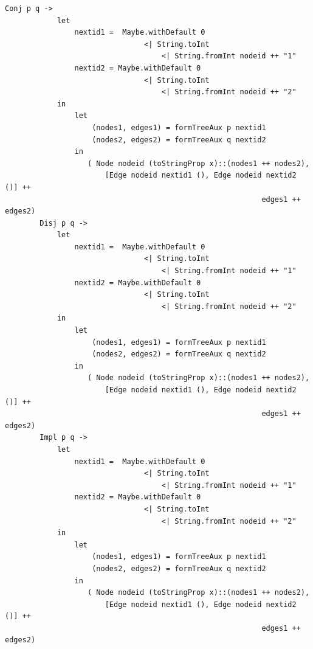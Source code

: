 \documentclass[a4paper]{report}
\begin{document}
\begin{lstlisting}[caption= Definición de las funciones \textit{formTree} y \textit{formTree2DOT}]
        Conj p q -> 
            let 
                nextid1 =  Maybe.withDefault 0 
                                <| String.toInt 
                                    <| String.fromInt nodeid ++ "1"
                nextid2 = Maybe.withDefault 0 
                                <| String.toInt 
                                    <| String.fromInt nodeid ++ "2"
            in
                let 
                    (nodes1, edges1) = formTreeAux p nextid1
                    (nodes2, edges2) = formTreeAux q nextid2
                in
                   ( Node nodeid (toStringProp x)::(nodes1 ++ nodes2),  
                       [Edge nodeid nextid1 (), Edge nodeid nextid2 ()] ++ 
                                                           edges1 ++ edges2)
        Disj p q -> 
            let 
                nextid1 =  Maybe.withDefault 0 
                                <| String.toInt 
                                    <| String.fromInt nodeid ++ "1"
                nextid2 = Maybe.withDefault 0 
                                <| String.toInt 
                                    <| String.fromInt nodeid ++ "2"
            in
                let 
                    (nodes1, edges1) = formTreeAux p nextid1
                    (nodes2, edges2) = formTreeAux q nextid2
                in
                   ( Node nodeid (toStringProp x)::(nodes1 ++ nodes2),  
                       [Edge nodeid nextid1 (), Edge nodeid nextid2 ()] ++ 
                                                           edges1 ++ edges2)
        Impl p q -> 
            let 
                nextid1 =  Maybe.withDefault 0 
                                <| String.toInt 
                                    <| String.fromInt nodeid ++ "1"
                nextid2 = Maybe.withDefault 0 
                                <| String.toInt 
                                    <| String.fromInt nodeid ++ "2"
            in
                let 
                    (nodes1, edges1) = formTreeAux p nextid1
                    (nodes2, edges2) = formTreeAux q nextid2
                in
                   ( Node nodeid (toStringProp x)::(nodes1 ++ nodes2),  
                       [Edge nodeid nextid1 (), Edge nodeid nextid2 ()] ++ 
                                                           edges1 ++ edges2)
        
        
        
        
        
        
        
        
        
        
        

\end{lstlisting}
\end{document}
